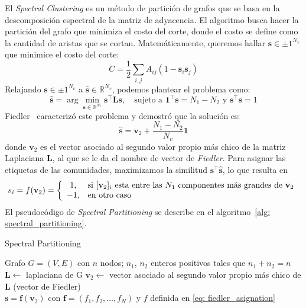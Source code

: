 \documentclass{article}
\begin{document}
El \emph{Spectral Clustering} es un método de partición de grafos que se basa en la descomposición espectral de la matriz de adyacencia. El algoritmo busca hacer la partición del grafo que minimiza el costo del corte, donde el costo se define como la cantidad de aristas que se cortan. Matemáticamente, queremos hallar $\mathbf{s}\in{\pm 1}^{N_v}$ que minimice el costo del corte:
\begin{equation*}
    C = \frac{1}{2} \sum_{i,j} A_{ij} (1 - \mathbf{s}_i \mathbf{s}_j)
\end{equation*}
Relajando $\mathbf{s}\in{\pm 1}^{N_v}$ a $\mathbf{\hat{s}}\in{\mathbb{R}}^{N_v}$, podemos plantear el problema como:
\begin{equation*}
    \mathbf{\hat{s}} = \arg \min_{\mathbf{s}\in{\mathbb{R}}^{N_v}} \mathbf{s}^\top \mathbf{L} \mathbf{s}, \quad \text{sujeto a } \mathbf{1}^\top \mathbf{s} = N_1 - N_2 \text{ y } \mathbf{s}^\top \mathbf{s} = 1
\end{equation*}
Fiedler~\cite{Fiedler1973} caracterizó este problema y demostró que la solución es:
\begin{equation*}
    \mathbf{\hat{s}} = \mathbf{v}_2 + \frac{N_1 - N_2}{N_v} \mathbf{1}
\end{equation*}
donde $\mathbf{v}_2$ es el vector asociado al segundo valor propio más chico de la matriz Laplaciana $\mathbf{L}$, al que se le da el nombre de vector de \emph{Fiedler}. Para asignar las
etiquetas de las comunidades, maximizamos la similitud $\mathbf{s}^\top\mathbf{\hat{s}}$, lo que resulta en
\begin{equation}
    \label{eq: fiedler_asignation}
    s_i = f(\mathbf{v}_2) = \left\lbrace 
    \begin{array}{c l}
         1, & \text{si } [\mathbf{v}_2]_i \text{ esta entre las $N_1$ componentes más grandes de $\mathbf{v}_2$} \\
        -1, & \text{en otro caso}
    \end{array}\right.
\end{equation}
El pseudocódigo de \emph{Spectral Partitioning} se describe en el algoritmo~\ref{alg: spectral_partitioning}.
\begin{algorithm}
    \caption{Spectral Partitioning}
    \label{alg: spectral_partitioning}
    \begin{algorithmic}
    \Require Grafo $G = (V, E)$ con $n$ nodos; $n_1$, $n_2$ enteros positivos tales que $n_1 + n_2 = n$
    \State  $\mathbf{L} \leftarrow $ laplaciana de G
    \State $\mathbf{v}_2 \leftarrow $ vector asociado al segundo valor propio más chico de $\mathbf{L}$ (vector de Fiedler)\\ 
    \Return $\mathbf{s} = \mathbf{f}(\mathbf{v}_2)$ con $\mathbf{f}=(f_1,f_2,\ldots,f_N)$ y $f$ definida en \eqref{eq: fiedler_asignation}
    \end{algorithmic}
\end{algorithm}
\end{document}
